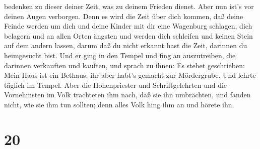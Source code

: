 bedenken zu dieser deiner Zeit, was zu deinem Frieden dienet. Aber nun
ist's vor deinen Augen verborgen.  Denn es wird die Zeit
über dich kommen, daß deine Feinde werden um dich und deine Kinder mit
dir eine Wagenburg schlagen, dich belagern und an allen Orten ängsten
 und werden dich schleifen und keinen Stein auf dem andern
lassen, darum daß du nicht erkannt hast die Zeit, darinnen du
heimgesucht bist.  Und er ging in den Tempel und fing an
auszutreiben, die darinnen verkauften und kauften,  und
sprach zu ihnen: Es stehet geschrieben: Mein Haus ist ein Bethaus; ihr
aber habt's gemacht zur Mördergrube.  Und lehrte täglich im
Tempel. Aber die Hohenpriester und Schriftgelehrten und die Vornehmsten
im Volk trachteten ihm nach, daß sie ihn umbrächten,  und
fanden nicht, wie sie ihm tun sollten; denn alles Volk hing ihm an und
hörete ihn.

\hypertarget{section-19}{%
\section{20}\label{section-19}}


